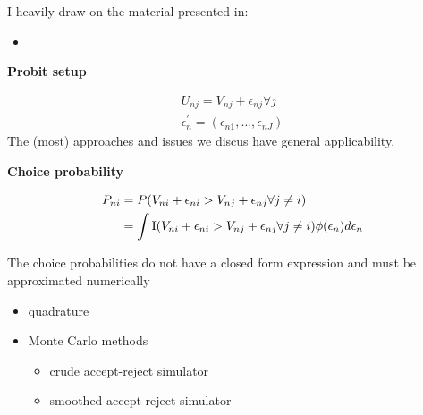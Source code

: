 \begin{frame} I heavily draw on the material presented in:

\begin{itemize}
\item {}
\end{itemize}

\end{frame}
\begin{frame}\textbf{Probit setup}\vspace{0.3cm}

\begin{align*}
U_{nj} = V_{nj} + \epsilon_{nj} \forall j \\
\epsilon^\prime_{n} = (\epsilon_{n1}, \hdots, \epsilon_{nJ})
\end{align*}
The (most) approaches and issues we discus have general applicability.

\end{frame}
\begin{frame}\textbf{Choice probability}\vspace{0.3cm}

\begin{align*}
  P_{ni} & = P(V_{ni} + \epsilon_{ni} > V_{nj} + \epsilon_{nj} \forall j \neq i) \\
         & = \int \mathrm{I} (V_{ni} + \epsilon_{ni} > V_{nj} + \epsilon_{nj} \forall j \neq i) \phi(\epsilon_n)d\epsilon_n
\end{align*}

\end{frame}
\begin{frame}\vspace{0.3cm}

The choice probabilities do not have a closed form expression and must be approximated numerically

\begin{itemize}\setlength\itemsep{1em}
  \item quadrature
  \item Monte Carlo methods
  \begin{itemize}\setlength\itemsep{1em}
    \item crude accept-reject simulator
    \item smoothed accept-reject simulator
  \end{itemize}
\end{itemize}
\end{frame}
